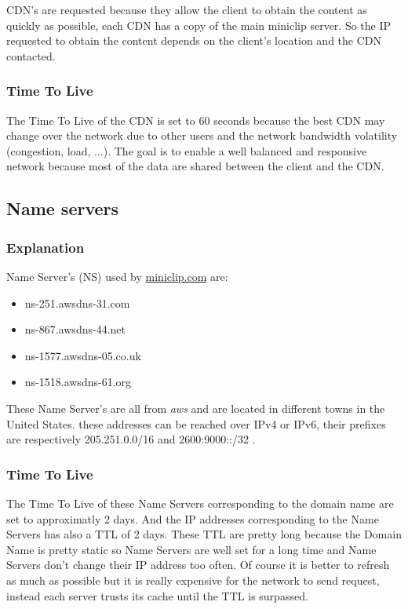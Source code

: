 \documentclass{article}
\begin{document}
CDN's are requested because they allow the client to obtain the content as quickly as possible, each CDN has a copy of the main miniclip server. So the IP requested to obtain the content depends on the client's location and the CDN contacted.

\subsubsection{Time To Live}
\label{subsub:ipttl}

The Time To Live of the CDN is set to 60 seconds because the best CDN may change over the network due to other users and the network bandwidth volatility (congestion, load, ...). The goal is to enable a well balanced and responsive network because most of the data are shared between the client and the CDN.

\subsection{Name servers}
\subsubsection{Explanation}
\label{subsub:nsexp}

Name Server's (NS) used by \url{miniclip.com} are:
\begin{itemize}
    \itemsep-0.1em 
    \item ns-251.awsdns-31.com
    \item ns-867.awsdns-44.net
    \item ns-1577.awsdns-05.co.uk
    \item ns-1518.awsdns-61.org
\end{itemize}

These Name Server's are all from \textit{aws} and are located in different towns in the United States. these addresses can be reached over IPv4 or IPv6, their prefixes are respectively 205.251.0.0/16 and 2600:9000::/32 .

\subsubsection{Time To Live}
\label{subsub:nsttl}

The Time To Live of these Name Servers corresponding to the domain name are set to approximatly 2 days. And the IP addresses corresponding to the Name Servers has also a TTL of 2 days. These TTL are pretty long because the Domain Name is pretty static so Name Servers are well set for a long time and Name Servers don't change their IP address too often. Of course it is better to refresh as much as possible but it is really expensive for the network to send request, instead each server trusts its cache until the TTL is surpassed.
\end{document}
